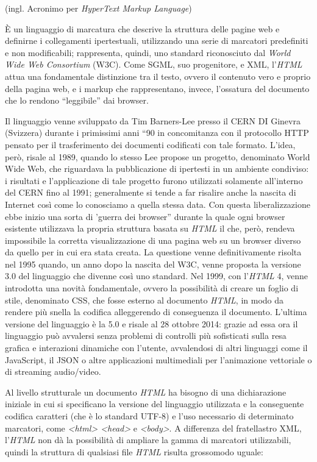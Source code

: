 \documentclass[
  b5paper,
  twoside,
  12pt,
  chapterprefix=false,
  bibliography=totocnumbered,
  parskip=false]{scrbook}
\begin{document}
(ingl. Acronimo per \emph{HyperText Markup Language})

È un linguaggio di marcatura che descrive la struttura delle pagine web
e definirne i collegamenti ipertestuali, utilizzando una serie di
marcatori predefiniti e non modificabili; rappresenta, quindi, uno
standard riconosciuto dal \emph{World Wide Web Consortium} (W3C). Come SGML,
suo progenitore, e XML, l'\emph{HTML} attua una fondamentale distinzione tra
il testo, ovvero il contenuto vero e proprio della pagina web, e i
markup che rappresentano, invece, l'ossatura del documento che lo
rendono \enquote{leggibile} dai browser.

Il linguaggio venne sviluppato da Tim Barners-Lee presso il CERN DI
Ginevra (Svizzera) durante i primissimi anni \enquote{90 in concomitanza con il
protocollo HTTP pensato per il trasferimento dei documenti codificati
con tale formato. L'idea, però, risale al 1989, quando lo stesso Lee
propose un progetto, denominato World Wide Web, che riguardava la
pubblicazione di ipertesti in un ambiente condiviso: i risultati e
l'applicazione di tale progetto furono utilizzati solamente all'interno
del CERN fino al 1991; generalmente si tende a far risalire anche la
nascita di Internet così come lo conosciamo a quella stessa data. Con
questa liberalizzazione ebbe inizio una sorta di 'guerra dei browser}
durante la quale ogni browser esistente utilizzava la propria struttura
basata su \emph{HTML} il che, però, rendeva impossibile la corretta
visualizzazione di una pagina web su un browser diverso da quello per in
cui era stata creata. La questione venne definitivamente risolta nel
1995 quando, un anno dopo la nascita del W3C, venne proposta la versione
3.0 del linguaggio che divenne così uno standard. Nel 1999, con l'\emph{HTML}
4, venne introdotta una novità fondamentale, ovvero la possibilità di
creare un foglio di stile, denominato CSS, che fosse esterno al
documento \emph{HTML}, in modo da rendere più snella la codifica alleggerendo
di conseguenza il documento. L'ultima versione del linguaggio è la 5.0 e
risale al 28 ottobre 2014: grazie ad essa ora il linguaggio può
avvalersi senza problemi di controlli più sofisticati sulla resa grafica
e interazioni dinamiche con l'utente, avvalendosi di altri linguaggi
come il JavaScript, il JSON o altre applicazioni multimediali per
l'animazione vettoriale o di streaming audio/video.

Al livello strutturale un documento \emph{HTML} ha bisogno di una
dichiarazione iniziale in cui si specificano la versione del linguaggio
utilizzata e la conseguente codifica caratteri (che è lo standard UTF-8)
e l'uso necessario di determinato marcatori, come \emph{\textless html\textgreater{} \textless head\textgreater{}} e
\emph{\textless body\textgreater{}}. A differenza del fratellastro XML, l'\emph{HTML} non dà la
possibilità di ampliare la gamma di marcatori utilizzabili, quindi la
struttura di qualsiasi file \emph{HTML} risulta grossomodo uguale:
\end{document}
